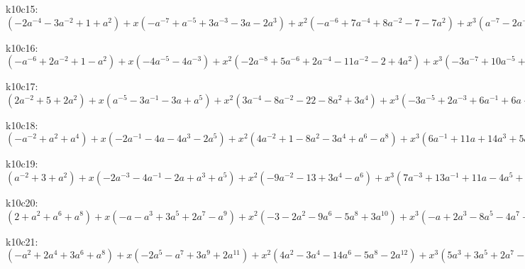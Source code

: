 k10c15: $ (-2a^{-4}-3a^{-2}+1+a^{2}) +x(-a^{-7}+a^{-5}+3a^{-3}-3a-2a^{3}) +x^{2}(-a^{-6}+7a^{-4}+8a^{-2}-7-7a^{2}) +x^{3}(a^{-7}-2a^{-5}-3a^{-3}+a^{-1}+8a+7a^{3}) +x^{4}(2a^{-6}-7a^{-4}-8a^{-2}+16+15a^{2}) +x^{5}(3a^{-5}-3a^{-3}-5a^{-1}-4a-5a^{3}) +x^{6}(4a^{-4}-a^{-2}-15-10a^{2}) +x^{7}(3a^{-3}-2a+a^{3}) +x^{8}(2a^{-2}+4+2a^{2}) +x^{9}(a^{-1}+a) $

k10c16: $ (-a^{-6}+2a^{-2}+1-a^{2}) +x(-4a^{-5}-4a^{-3}) +x^{2}(-2a^{-8}+5a^{-6}+2a^{-4}-11a^{-2}-2+4a^{2}) +x^{3}(-3a^{-7}+10a^{-5}+8a^{-3}+5a) +x^{4}(a^{-8}-6a^{-6}+2a^{-4}+17a^{-2}+4-4a^{2}) +x^{5}(2a^{-7}-7a^{-5}-4a^{-3}-2a^{-1}-7a) +x^{6}(3a^{-6}-3a^{-4}-13a^{-2}-6+a^{2}) +x^{7}(3a^{-5}-a^{-1}+2a) +x^{8}(2a^{-4}+4a^{-2}+2) +x^{9}(a^{-3}+a^{-1}) $

k10c17: $ (2a^{-2}+5+2a^{2}) +x(a^{-5}-3a^{-1}-3a+a^{5}) +x^{2}(3a^{-4}-8a^{-2}-22-8a^{2}+3a^{4}) +x^{3}(-3a^{-5}+2a^{-3}+6a^{-1}+6a+2a^{3}-3a^{5}) +x^{4}(-6a^{-4}+11a^{-2}+34+11a^{2}-6a^{4}) +x^{5}(a^{-5}-5a^{-3}-5a^{3}+a^{5}) +x^{6}(2a^{-4}-7a^{-2}-18-7a^{2}+2a^{4}) +x^{7}(2a^{-3}-2a^{-1}-2a+2a^{3}) +x^{8}(2a^{-2}+4+2a^{2}) +x^{9}(a^{-1}+a) $

k10c18: $ (-a^{-2}+a^{2}+a^{4}) +x(-2a^{-1}-4a-4a^{3}-2a^{5}) +x^{2}(4a^{-2}+1-8a^{2}-3a^{4}+a^{6}-a^{8}) +x^{3}(6a^{-1}+11a+14a^{3}+5a^{5}-4a^{7}) +x^{4}(-4a^{-2}+1+17a^{2}+6a^{4}-5a^{6}+a^{8}) +x^{5}(-7a^{-1}-10a-12a^{3}-6a^{5}+3a^{7}) +x^{6}(a^{-2}-5-15a^{2}-5a^{4}+4a^{6}) +x^{7}(2a^{-1}+a+3a^{3}+4a^{5}) +x^{8}(2+5a^{2}+3a^{4}) +x^{9}(a+a^{3}) $

k10c19: $ (a^{-2}+3+a^{2}) +x(-2a^{-3}-4a^{-1}-2a+a^{3}+a^{5}) +x^{2}(-9a^{-2}-13+3a^{4}-a^{6}) +x^{3}(7a^{-3}+13a^{-1}+11a-4a^{5}+a^{7}) +x^{4}(16a^{-2}+23-4a^{2}-8a^{4}+3a^{6}) +x^{5}(-5a^{-3}-8a^{-1}-15a-7a^{3}+5a^{5}) +x^{6}(-10a^{-2}-19-3a^{2}+6a^{4}) +x^{7}(a^{-3}-a^{-1}+3a+5a^{3}) +x^{8}(2a^{-2}+5+3a^{2}) +x^{9}(a^{-1}+a) $

k10c20: $ (2+a^{2}+a^{6}+a^{8}) +x(-a-a^{3}+3a^{5}+2a^{7}-a^{9}) +x^{2}(-3-2a^{2}-9a^{6}-5a^{8}+3a^{10}) +x^{3}(-a+2a^{3}-8a^{5}-4a^{7}+7a^{9}) +x^{4}(1+3a^{4}+17a^{6}+9a^{8}-4a^{10}) +x^{5}(a-a^{3}+9a^{5}+3a^{7}-8a^{9}) +x^{6}(a^{2}-2a^{4}-12a^{6}-8a^{8}+a^{10}) +x^{7}(a^{3}-4a^{5}-3a^{7}+2a^{9}) +x^{8}(a^{4}+3a^{6}+2a^{8}) +x^{9}(a^{5}+a^{7}) $

k10c21: $ (-a^{2}+2a^{4}+3a^{6}+a^{8}) +x(-2a^{5}-a^{7}+3a^{9}+2a^{11}) +x^{2}(4a^{2}-3a^{4}-14a^{6}-5a^{8}-2a^{12}) +x^{3}(5a^{3}+3a^{5}+2a^{7}-4a^{11}) +x^{4}(-4a^{2}+4a^{4}+20a^{6}+9a^{8}-2a^{10}+a^{12}) +x^{5}(-7a^{3}-3a^{5}-2a^{9}+2a^{11}) +x^{6}(a^{2}-6a^{4}-14a^{6}-5a^{8}+2a^{10}) +x^{7}(2a^{3}-a^{5}-a^{7}+2a^{9}) +x^{8}(2a^{4}+4a^{6}+2a^{8}) +x^{9}(a^{5}+a^{7}) $

